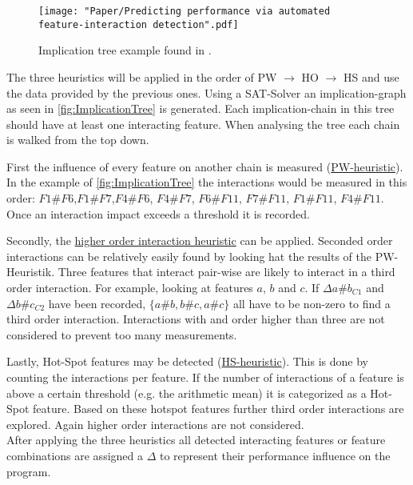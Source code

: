 \setlength\intextsep{0pt}
\begin{wrapfigure}[13]{l}{0.5\textwidth}
	\texttt{[image: "Paper/Predicting performance via automated feature-interaction detection".pdf]}
	\captionsetup{width=0.95\linewidth}
	\caption{Implication tree example found in \cite{AutomatedFeatureDetectionSiegmund2012}. }
	\label{fig:ImplicationTree}
\end{wrapfigure}

The three heuristics will be applied in the order of PW $\rightarrow$ HO $\rightarrow$ HS and use the data provided by the previous ones. Using a SAT-Solver an implication-graph as seen in \autoref{fig:ImplicationTree} is generated. Each implication-chain in this tree should have at least one interacting feature. When analysing the tree each chain is walked from the top down.

First the influence of every feature on another chain is measured (\hyperref[lab:PW]{PW-heuristic}). In the example of \autoref{fig:ImplicationTree} the interactions would be measured in this order: $F1\#F6$,$ F1\#F7$,$ F4\#F6$, $F4\#F7$, $F6\#F11$, $F7\#F11$, $F1\#F11$, $F4\#F11$. Once an interaction impact exceeds a threshold it is recorded.

Secondly, the \hyperref[lab:HO]{higher order interaction heuristic} can be applied. Seconded order interactions can be relatively easily found by looking hat the results of the PW-Heuristik. Three features that interact pair-wise are likely to interact in a third order interaction. For example, looking at features $a$, $b$ and $c$. If $\Delta a\#b_{C1}$ and $\Delta b\#c_{C2}$ have been recorded, $\{a\#b, b\#c, a\#c\}$ all have to be non-zero to find a third order interaction. Interactions with and order higher than three are not considered to prevent too many measurements.

Lastly, Hot-Spot features may be detected (\hyperref[lab:HS]{HS-heuristic}). This is done by counting the interactions per feature. If the number of interactions of a feature is above a certain threshold (e.g. the arithmetic mean) it is categorized as a Hot-Spot feature. Based on these hotspot features further third order interactions are explored. Again higher order interactions are not considered. \\
After applying the three heuristics all detected interacting features or feature combinations are assigned a $\Delta$ to represent their performance influence on the program.

